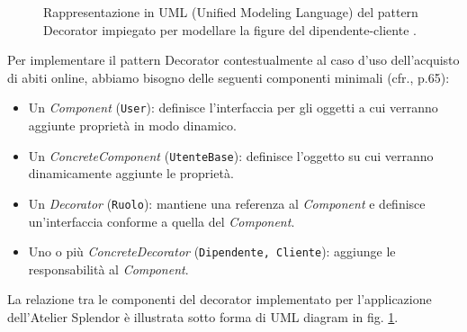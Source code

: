 \documentclass[12pt]{article}
\begin{document}
\begin{figure}[!h]
  \caption{\small Rappresentazione in UML (Unified Modeling Language) del pattern Decorator impiegato per modellare la figure del dipendente-cliente \cite{uml_riferimento}.}
  \label{fig:uml_diagram_decorator}
\end{figure}

Per implementare il pattern Decorator contestualmente al caso d'uso dell'acquisto di abiti online, abbiamo bisogno delle seguenti componenti minimali (cfr.\cite{gof_sunt}, p.65):
\begin{itemize}
    \item Un {\em Component} ({\tt User}): definisce l'interfaccia per gli oggetti a cui verranno aggiunte proprietà in modo dinamico.
    \item Un {\em ConcreteComponent} ({\tt UtenteBase}): definisce l'oggetto su cui verranno dinamicamente aggiunte le proprietà.
    \item Un {\em Decorator} ({\tt Ruolo}): mantiene una referenza al {\em Component} e definisce un'interfaccia conforme a quella del {\em Component}.
    \item Uno o più {\em ConcreteDecorator} ({\tt Dipendente, Cliente}): aggiunge le responsabilità al {\em Component}.
\end{itemize}
La relazione tra le componenti del decorator implementato per l'applicazione dell'Atelier Splendor è illustrata sotto forma di UML diagram in fig. \ref{fig:uml_diagram_decorator}.
\end{document}
